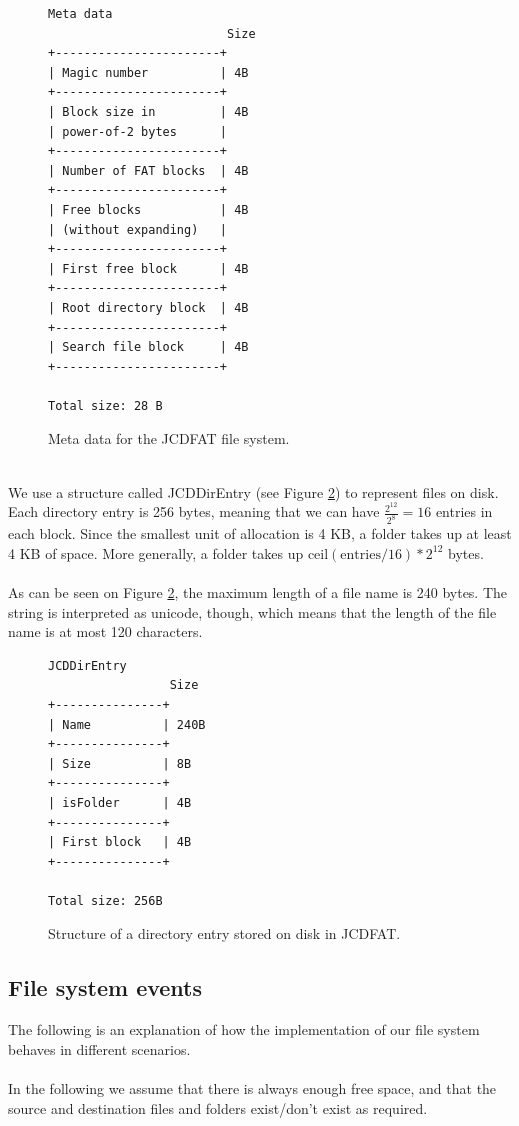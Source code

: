 \documentclass[a4paper,12pt]{article}
\begin{document}
\begin{figure}[ht]
    \begin{verbatim}
Meta data
                         Size
+-----------------------+
| Magic number          | 4B
+-----------------------+
| Block size in         | 4B
| power-of-2 bytes      |
+-----------------------+
| Number of FAT blocks  | 4B
+-----------------------+
| Free blocks           | 4B
| (without expanding)   |
+-----------------------+
| First free block      | 4B
+-----------------------+
| Root directory block  | 4B
+-----------------------+
| Search file block     | 4B
+-----------------------+

Total size: 28 B
    \end{verbatim}
    \caption{Meta data for the JCDFAT file system.}
    \label{fig:meta_data}
\end{figure}
~\\
We use a structure called JCDDirEntry (see Figure \ref{fig:directory_entry}) to represent files on disk. Each directory entry is 256 bytes, meaning that we can have $\frac{2^{12}}{2^8} = 16$ entries in each block. Since the smallest unit of allocation is 4 KB, a folder takes up at least 4 KB of space. More generally, a folder takes up $\text{ceil}(\text{entries} / 16) * 2^{12}$ bytes.\\
\\
As can be seen on Figure \ref{fig:directory_entry}, the maximum length of a file name is 240 bytes. The string is interpreted as unicode, though, which means that the length of the file name is at most 120 characters.

\begin{figure}[ht]
    \begin{verbatim}
JCDDirEntry
                 Size
+---------------+
| Name          | 240B
+---------------+
| Size          | 8B
+---------------+
| isFolder      | 4B
+---------------+
| First block   | 4B
+---------------+

Total size: 256B
    \end{verbatim}
    \caption{Structure of a directory entry stored on disk in JCDFAT.}
    \label{fig:directory_entry}
\end{figure}

\subsection{File system events}\label{file-system-events}
The following is an explanation of how the implementation of our file system behaves in different scenarios.\\
\\
In the following we assume that there is always enough free space, and that the source and destination files and folders exist/don't exist as required.\\
\end{document}
